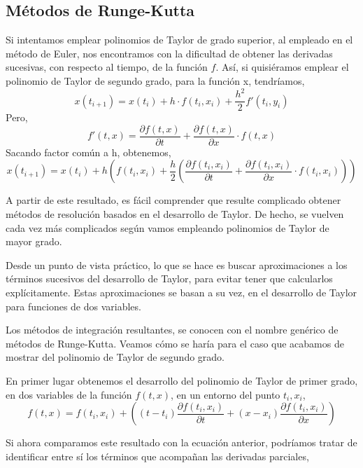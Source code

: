 \subsection{Métodos de Runge-Kutta} 
Si intentamos emplear polinomios de Taylor de grado superior, al empleado en el método de Euler, nos encontramos con la dificultad de obtener las derivadas sucesivas, con respecto al tiempo, de la función $f$. Así, si quisiéramos emplear el polinomio de Taylor de segundo grado, para la función x, tendríamos,
\begin{equation*}
x(t_{i+1})=x(t_i)+h\cdot f(t_i,x_i)+\frac{h^2}{2}f'(t_i,y_i)
\end{equation*}
Pero,
\begin{equation*}
f'(t,x)=\frac{\partial f(t,x)}{\partial t}+\frac{\partial f(t,x)}{\partial x}\cdot f(t,x)
\end{equation*}
Sacando factor común a h, obtenemos,
\begin{equation*}
x(t_{i+1})=x(t_i)+h\left(f(t_i,x_i)+\frac{h}{2}\left(\frac{\partial f(t_i,x_i)}{\partial t}+\frac{\partial f(t_i,x_i)}{\partial x}\cdot f(t_i,x_i)\right)\right)
\end{equation*}

A partir de este resultado, es fácil comprender que resulte complicado obtener métodos de resolución basados en el desarrollo de Taylor. De hecho, se vuelven cada vez más complicados según vamos empleando polinomios de Taylor de mayor grado.

Desde un punto de vista práctico, lo que se hace es buscar aproximaciones a los términos sucesivos del desarrollo de Taylor, para evitar tener que calcularlos explícitamente. Estas aproximaciones se basan a su vez, en el desarrollo de Taylor para funciones de dos variables.

Los métodos de integración resultantes, se conocen con el nombre genérico de métodos de Runge-Kutta. Veamos cómo se haría para el caso que acabamos de mostrar del polinomio de Taylor de segundo grado.

En primer lugar obtenemos el desarrollo del polinomio de Taylor de primer grado, en dos variables de la función $f(t,x)$, en un entorno del punto $t_i,x_i$,
\begin{equation*}
f(t,x)=f(t_i,x_i)+\left((t-t_i)\frac{\partial f(t_i,x_i)}{\partial t}+(x-x_i)\frac{\partial f(t_i,x_i)}{\partial x}\right)
\end{equation*}

Si ahora comparamos este resultado con la ecuación anterior, podríamos tratar de identificar entre sí los términos que acompañan las derivadas parciales, 

